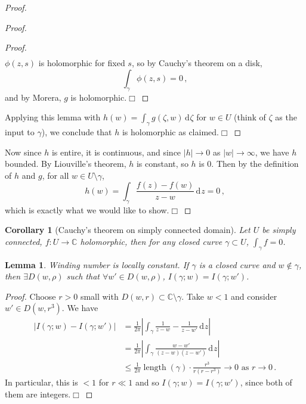 \documentclass{article}
\theoremstyle{plain}\theoremheaderfont{\normalfont\itshape}\theorembodyfont{\rmfamily}\theoremseparator{.}\newtheorem*{rem}{Remark}\newtheorem*{ex}{Example}\newtheorem*{proof}{Proof}\newtheorem*{altp}{Alternative proof}\newtheorem*{con}{Consequences}\newtheorem*{notn}{Notations}\newtheorem*{cau}{Caution}\newtheorem*{term}{Terminology}\newtheorem*{keyex}{Key example}
\theoremstyle{plain}\theoremheaderfont{\normalfont\bfseries}\theorembodyfont{\rmfamily}\theoremseparator{.}\newtheorem{thm}{Theorem}[section]\newtheorem{lem}[thm]{Lemma}\newtheorem{prop}[thm]{Proposition}\newtheorem*{cor}{Corollary}\newtheorem{defn}[thm]{Definition}\newtheorem{clm}[thm]{Claim}\newtheorem{clminproof}{Claim}\newtheorem{leminproof}{Lemma}\newtheorem{app}{Application}
\theoremstyle{break}\theoremheaderfont{\normalfont\itshape}\theorembodyfont{\rmfamily}\theoremseparator{.\medskip}\newtheorem*{proofskip}{Proof}\newtheorem*{exs}{Examples}\newtheorem*{rems}{Remarks}\newtheorem*{rec}{Recall}\newtheorem*{ppts}{Properties}
\theoremstyle{break}\theoremheaderfont{\normalfont\bfseries}\theorembodyfont{\rmfamily}\theoremseparator{.\medskip}\newtheorem{lemskip}[thm]{Lemma}\newtheorem{defnskip}[thm]{Definition}\newtheorem{propskip}[thm]{Proposition}\newtheorem{thmskip}[thm]{Theorem}
\numberwithin{equation}{section}
\DeclareMathOperator*{\length}{length}
\newcommand{\qed}{\hfill\ensuremath{\Box}}
\newcommand{\abs}[1]{\left|#1\right|}
\newcommand{\dd}[2][]{\,\mathrm{d}^{#1} #2}
\newcommand{\CC}{\mathbb{C}}
\begin{document}
\begin{proof}
\begin{itemize}[parsep=1em,rightmargin=30pt]
\begin{proof}
\begin{itemize}[parsep=1em,rightmargin=30pt]
\begin{proof}
\begin{align*}
                        \end{align*}
                        \(\phi(z,s)\) is holomorphic for fixed \(s\), so by Cauchy's theorem on a disk,
                        \[\int_\gamma\phi(z,s)=0\,,\]
                        and by Morera, \(g\) is holomorphic.\qed
                    \end{proof}
                \end{itemize}
                Applying this lemma with \(h(w)=\int_\gamma g(\zeta,w)\dd{\zeta}\) for \(w\in U\) (think of \(\zeta\) as the input to \(\gamma\)), we conclude that \(h\) is holomorphic as claimed.\qed 
            \end{proof}
        \end{itemize}

        Now since \(h\) is entire, it is continuous, and since \(\abs{h}\to 0\) as \(\abs{w}\to\infty\), we have \(h\) bounded. By Liouville's theorem, \(h\) is constant, so \(h\) is \(0\). Then by the definition of \(h\) and \(g\), for all \(w\in U\setminus\gamma\),
        \[ h(w)=\int_\gamma\frac{f(z)-f(w)}{z-w}\dd{z}=0\,,\]
        which is exactly what we would like to show.\qed
    \end{proof}
    \begin{cor}[Cauchy's theorem on simply connected domain]
        Let \(U\) be simply connected, \(f:U\to\CC\) holomorphic, then for any closed curve \(\gamma\subset U\), \(\int_\gamma f=0\).
    \end{cor}
    \begin{lem}
        Winding number is locally constant. If \(\gamma\) is a closed curve and \(w\notin\gamma\), then \(\exists D(w,\rho)\) such that \(\forall w'\in D(w,\rho)\), \(I(\gamma;w)=I(\gamma;w')\).
    \end{lem}
    \begin{proof}
        Choose \(r>0\) small with \(D(w,r)\subset\CC\setminus\gamma\). Take \(w<1\) and consider \(w'\in D(w,r^3)\). We have
        \begin{align*}
            \abs{I(\gamma;w)-I(\gamma;w')}&=\frac{1}{2\pi}\abs{\int_\gamma\frac{1}{z-w}-\frac{1}{z-w'}\dd{z}}\\
            &=\frac{1}{2\pi}\abs{\int_\gamma\frac{w-w'}{(z-w)(z-w')}\dd{z}}\\
            &\le\frac{1}{2\pi}\length(\gamma)\cdot\frac{r^3}{r(r-r^3)}\to 0\text{ as }r\to 0\,.
        \end{align*}
        In particular, this is \(<1\) for \(r\ll 1\) and so \(I(\gamma;w)=I(\gamma;w')\), since both of them are integers.\qed
    \end{proof}
\end{document}

